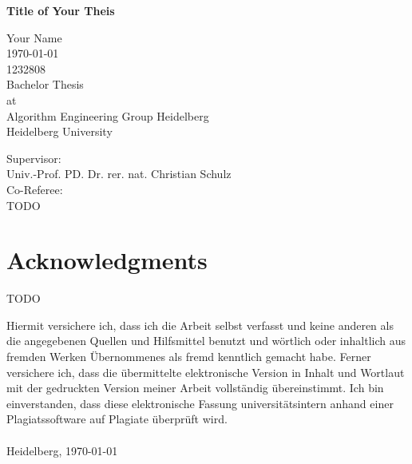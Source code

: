 \documentclass[a4paper,12pt,bibtotoc,titlepage, liststotoc,BCOR7mm,headsepline,pointlessnumbers]{scrbook}
\title{\upbtitel}
\author{
\upbautor
}
\date{\upbdate}
\newcommand{\upbautor}{Your Name} %
\newcommand{\upbtitel}{Title of Your Theis} %
\newcommand{\upbtyp}{Bachelor Thesis} %
\newcommand{\upbmatrikelnr}{1232808} %
\newcommand{\upbzweitgutachter}{TODO} %
\theoremstyle{break} %
\begin{document}
\begin{titlepage}
\begin{center}
\vspace*{-0.75cm}
{\bf{ \huge{\upbtitel} }} \\

\vspace*{1.0cm}


\large{\upbautor}  \\
\vspace*{0.5cm}
\Large{\today}\\
\vspace*{0.5cm}
\upbmatrikelnr \\
\vspace*{1.0cm}
\upbtyp\\
\vspace*{0.25cm}
\normalsize
at \\
\vspace*{0.25cm}
Algorithm Engineering Group Heidelberg \\
Heidelberg University \\
\vspace*{0.25cm}

\vspace*{0.75cm}

\vspace*{0.5cm}

Supervisor:\\
Univ.-Prof. PD. Dr. rer. nat. Christian Schulz \\
 
\vspace*{0.50cm}
Co-Referee: \\
 \upbzweitgutachter               

\end{center}
\end{titlepage}

\chapter*{Acknowledgments}
TODO

\vspace*{\fill}


Hiermit versichere ich, dass ich die Arbeit selbst verfasst und keine anderen als die angegebenen Quellen und Hilfsmittel benutzt und wörtlich oder inhaltlich aus fremden Werken Übernommenes als fremd kenntlich gemacht habe. Ferner versichere ich, dass die übermittelte elektronische Version in Inhalt und Wortlaut mit der gedruckten Version meiner Arbeit vollständig übereinstimmt. Ich bin einverstanden, dass diese elektronische Fassung universitätsintern anhand einer Plagiatssoftware auf Plagiate überprüft wird. \\ \\
Heidelberg, \today \\ \\  \\ %
\end{document}
